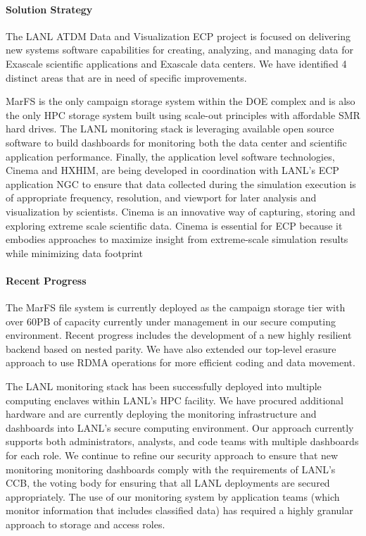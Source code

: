 \paragraph{Solution Strategy}
The LANL ATDM Data and Visualization ECP project is focused on delivering new
systems software capabilities for creating, analyzing, and managing data for
Exascale scientific applications and Exascale data centers. We have identified
4 distinct areas that are in need of specific improvements.

MarFS is the only campaign storage system within the DOE complex and is
also the only HPC storage system built using scale-out principles with affordable
SMR hard drives. The LANL monitoring stack is leveraging available open source
software to build dashboards for monitoring both the data center and
scientific application performance. Finally, the application level software
technologies, Cinema and HXHIM, are being developed in coordination with
LANL's ECP application NGC to ensure that data collected during the simulation
execution is of appropriate frequency, resolution, and viewport for later
analysis and visualization by scientists. Cinema is an innovative way of
capturing, storing and exploring extreme scale scientific data. Cinema is
essential for ECP because it embodies approaches to maximize insight from
extreme-scale simulation results while minimizing data footprint 

\paragraph{Recent Progress}
The MarFS file system is currently deployed as the campaign storage tier
with over 60PB of capacity currently under management in our secure computing
environment. Recent progress includes the development of a new highly
resilient backend based on nested parity. We have also extended our top-level
erasure approach to use RDMA operations for more efficient coding and data movement.

The LANL monitoring stack has been successfully deployed into multiple
computing enclaves within LANL's HPC facility. We have procured additional
hardware and are currently deploying the monitoring infrastructure and
dashboards into LANL's secure computing environment. Our approach currently
supports both administrators, analysts, and code teams with multiple
dashboards for each role. We continue to refine our security approach to
ensure that new monitoring monitoring dashboards comply with the requirements
of LANL's CCB, the voting body for ensuring that all LANL deployments are
secured appropriately. The use of our monitoring system by application teams
(which monitor information that includes classified data) has required a
highly granular approach to storage and access roles.

